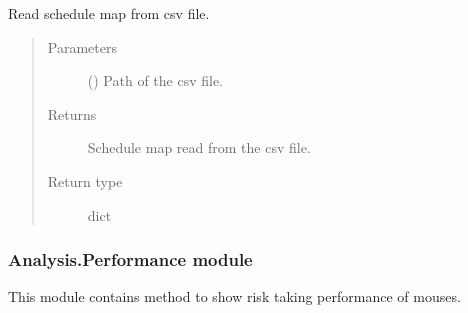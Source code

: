 \documentclass[letterpaper,10pt,english]{sphinxmanual}
\begin{document}

\begin{fulllineitems}
\label{\detokenize{NoSeMazeController/Analysis:Analysis.Conversion.read_schedule_map}}
\pysigstartsignatures
{}
\pysigstopsignatures
\sphinxAtStartPar
Read schedule map from csv file.
\begin{quote}\begin{description}
\item[{Parameters}] \leavevmode
\sphinxAtStartPar
{} () \textendash{} Path of the csv file.

\item[{Returns}] \leavevmode
\sphinxAtStartPar
{} \textendash{} Schedule map read from the csv file.

\item[{Return type}] \leavevmode
\sphinxAtStartPar
dict

\end{description}\end{quote}

\end{fulllineitems}


\begin{DUlineblock}{0em}
\item[] 
\end{DUlineblock}


\subsubsection{Analysis.Performance module}
\label{\detokenize{NoSeMazeController/Analysis:module-Analysis.Performance}}\label{\detokenize{NoSeMazeController/Analysis:analysis-performance-module}}
\sphinxAtStartPar
This module contains method to show risk taking performance of mouses.
\end{document}
